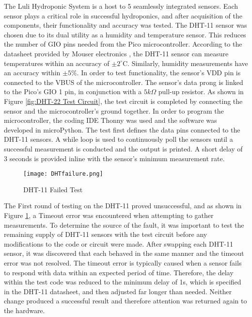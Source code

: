 \documentclass[12pt]{article} %
\begin{document}
The Luli Hydroponic System is a host to 5 seamlessly integrated sensors. Each sensor plays a critical role in successful hydroponics, and after acquisition of the components, their functionality and accuracy was tested. The DHT-11 sensor was chosen due to its dual utility as a humidity and temperature sensor. This reduces the number of GIO pins needed from the Pico microcontroller. According to the datasheet provided by Mouser electronics \cite{ref_dht}, the DHT-11 sensor can measure temperatures within an accuracy of $\pm 2^\circ\text{C}$. Similarly, humidity measurements have an accuracy within $\pm 5 \%$. In order to test functionality, the sensor’s VDD pin is connected to the VBUS of the microcontroller. The sensor’s data prong is linked to the Pico’s GIO 1 pin, in conjunction with a $5 k\Omega$ pull-up resistor. As shown in Figure \ref{fig:DHT-22 Test Circuit}, the test circuit is completed by connecting the sensor and the microcontroller’s ground together. In order to program the microcontroller, the coding IDE Thonny was used and the software was developed in microPython. The test first defines the data pins connected to the DHT-11 sensors. A while loop is used to continuously poll the sensors until a successful measurement is conducted and the output is printed. A short delay of 3 seconds is provided inline with the sensor’s minimum measurement rate.

\begin{figure}[H]
  \centering
  \texttt{[image: DHTfailure.png]}
  \caption{DHT-11 Failed Test}
  \label{fig:DHT-22 Accuracy test}
\end{figure}

The First round of testing on the DHT-11 proved unsuccessful, and as shown in Figure \ref{fig:DHT-22 Accuracy test}, a Timeout error was encountered when attempting to gather measurements. To determine the source of the fault, it was important to test the remaining supply of DHT-11 sensors with the test circuit before any modifications to the code or circuit were made. After swapping each DHT-11 sensor, it was discovered that each behaved in the same manner and the timeout error was not resolved. The timeout error is typically caused when a sensor fails to respond with data within an expected period of time. Therefore, the delay within the test code was reduced to the minimum delay of 1s, which is specified in the DHT-11 datasheet, and then adjusted far longer than needed. Neither change produced a successful result and therefore attention was returned again to the hardware. 
\end{document}
